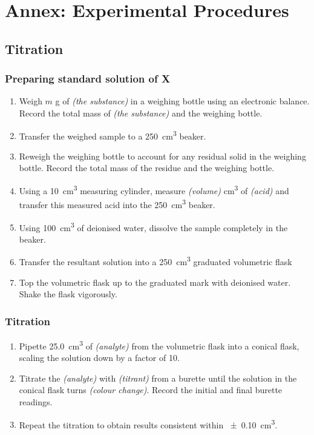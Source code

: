 \cleardoublepage
\chapter{Annex: Experimental Procedures}
\section{Titration}
\subsection{Preparing standard solution of X}
\begin{enumerate}

\item
  Weigh \(m\) \si{\gram} of \emph{(the substance)} in a
  weighing bottle using an electronic balance. Record the total mass of
  \emph{(the substance)} and the weighing bottle.
\item
  Transfer the weighed sample to a \SI{250}{\centi\metre\cubed} beaker.
\item
  Reweigh the weighing bottle to account for any residual solid in the
  weighing bottle. Record the total mass of the residue and the weighing
  bottle.
\item
  Using a \SI{10}{\centi\metre\cubed} measuring cylinder, measure
  \emph{(volume)} \si{\centi\metre\cubed} of \emph{(acid)} and
  transfer this measured acid into the \SI{250}{\centi\metre\cubed} beaker.
\item
  Using \SI{100}{\centi\metre\cubed} of deionised water, dissolve the
  sample completely in the beaker.
\item
  Transfer the resultant solution into a \SI{250}{\centi\metre\cubed}
  graduated volumetric flask
\item
  Top the volumetric flask up to the graduated mark with deionised
  water. Shake the flask vigorously.
\end{enumerate}

\subsection{Titration}

\begin{enumerate}

\item
  Pipette \SI{25.0}{\centi\metre\cubed} of \emph{(analyte)} from the
  volumetric flask into a conical flask, scaling the solution down by a
  factor of \num{10}.
\item
  Titrate the \emph{(analyte)} with \emph{(titrant)} from
  a burette until the solution in the conical flask turns
  \emph{(colour change)}. Record the initial and final burette
  readings.
\item
  Repeat the titration to obtain results consistent within \SI{\pm0.10}{\centi\metre\cubed}.
\end{enumerate}

